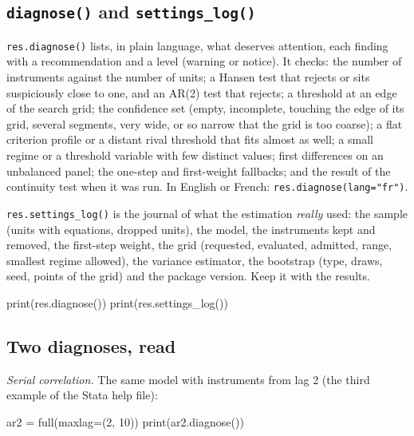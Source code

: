 \documentclass[
  10.5pt,
  a4paper,
]{article}
\newenvironment{Shaded}{}{}
\newcommand{\BuiltInTok}[1]{\textcolor[rgb]{0.00,0.50,0.00}{#1}}
\newcommand{\DecValTok}[1]{\textcolor[rgb]{0.25,0.63,0.44}{#1}}
\newcommand{\NormalTok}[1]{#1}
\newcommand{\OperatorTok}[1]{\textcolor[rgb]{0.40,0.40,0.40}{#1}}
\begin{document}
\subsection{\texorpdfstring{\texttt{diagnose()} and
\texttt{settings\_log()}}{diagnose() and settings\_log()}}\label{diagnose-and-settings_log}

\texttt{res.diagnose()} lists, in plain language, what deserves
attention, each finding with a recommendation and a level (warning or
notice). It checks: the number of instruments against the number of
units; a Hansen test that rejects or sits suspiciously close to one, and
an AR(2) test that rejects; a threshold at an edge of the search grid;
the confidence set (empty, incomplete, touching the edge of its grid,
several segments, very wide, or so narrow that the grid is too coarse);
a flat criterion profile or a distant rival threshold that fits almost
as well; a small regime or a threshold variable with few distinct
values; first differences on an unbalanced panel; the one-step and
first-weight fallbacks; and the result of the continuity test when it
was run. In English or French: \texttt{res.diagnose(lang="fr")}.

\texttt{res.settings\_log()} is the journal of what the estimation
\emph{really} used: the sample (units with equations, dropped units),
the model, the instruments kept and removed, the first-step weight, the
grid (requested, evaluated, admitted, range, smallest regime allowed),
the variance estimator, the bootstrap (type, draws, seed, points of the
grid) and the package version. Keep it with the results.

\begin{Shaded}
\begin{Highlighting}[]
\BuiltInTok{print}\NormalTok{(res.diagnose())}
\BuiltInTok{print}\NormalTok{(res.settings\_log())}
\end{Highlighting}
\end{Shaded}

\subsection{Two diagnoses, read}\label{two-diagnoses-read}

\emph{Serial correlation.} The same model with instruments from lag 2
(the third example of the Stata help file):

\begin{Shaded}
\begin{Highlighting}[]
\NormalTok{ar2 }\OperatorTok{=}\NormalTok{ full(maxlag}\OperatorTok{=}\NormalTok{(}\DecValTok{2}\NormalTok{, }\DecValTok{10}\NormalTok{))}
\BuiltInTok{print}\NormalTok{(ar2.diagnose())}
\end{Highlighting}
\end{Shaded}
\end{document}
